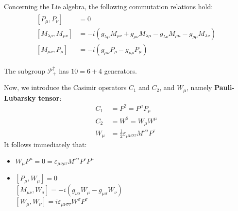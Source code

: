 \documentclass[../../main/main.tex]{subfiles}
\begin{document}
Concerning the Lie algebra, the following commutation relations hold:
\begin{equation}
    \begin{gathered}
        \begin{aligned}
        [P_\mu,P_\nu] &= 0  \\
        [M_{\lambda \rho}, M_{\mu \nu}] &= -i (g_{\lambda \mu}M_{\rho \nu} + g_{\rho \nu}M_{\lambda \mu} - g_{\lambda \nu}M_{\rho \mu} - g_{\rho \mu}M_{\lambda \nu})    \\
        [M_{\mu \nu},P_{\rho}] &= - i (g_{\mu \nu} P_{\rho} - g_{\mu \rho} P_{\mu})
        \end{aligned}
    \end{gathered}
    \label{eq:}
\end{equation}

The subgroup \( \mathcal{P}^{\uparrow}_{+} \) has \( 10 = 6 + 4 \) generators.

Now, we introduce the Casimir operators \( C_1 \) and \( C_2 \), and \( W_\mu \), namely \textbf{Pauli-Lubarsky tensor}:
\begin{align}
    C_1 &= P^2 = P^\mu P_\mu   \\
    C_2 &= W^2 = W_\mu W^\mu   \\
    W_\mu &= \frac{1}{2} \varepsilon _{\mu \nu \sigma \tau} M^{\nu \sigma} P^{\tau}
\end{align}
It follows immediately that:
\begin{itemize}
    \item \( W_\mu P^\mu = 0 = \varepsilon _{\mu \nu \rho \tau} M^{\nu \sigma} P^{\tau } P^{\mu} \)
    \item \( [P_\mu, W_\mu] = 0 \)\\
        \( [M_{\mu \nu}, W_{\sigma}] = - i (g_{\nu \sigma}W_\mu - g_{\mu \sigma}W_\nu)\)\\
        \( [W_\mu,W_\nu] = i \varepsilon _{\mu \nu \sigma \tau} W^{\sigma}P^\tau \)
\end{itemize}
\end{document}
